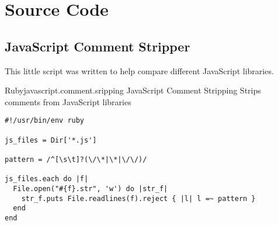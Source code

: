 \chapter{Source Code}

\section{JavaScript Comment Stripper}
\label{section:source.code.javascript.comment.stripper}

This little script was written to help
compare different JavaScript libraries.


\begin{scode}{Ruby}{javascript.comment.sripping}{%
  JavaScript Comment Stripping}{%
  Strips comments from JavaScript libraries}
\begin{lstlisting}
#!/usr/bin/env ruby

js_files = Dir['*.js']

pattern = /^[\s\t]?(\/\*|\*|\/\/)/

js_files.each do |f|
  File.open("#{f}.str", 'w') do |str_f| 
    str_f.puts File.readlines(f).reject { |l| l =~ pattern }
  end
end
\end{lstlisting}
\end{scode}
